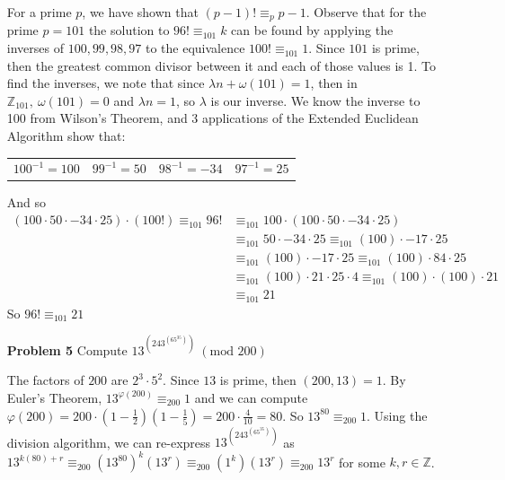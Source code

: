 \documentclass[letterpaper]{article}
\newcommand{\Integers}{\mathbb{Z}}
\begin{document}
\begin{itemize}
          For a prime \(p\), we have shown that \((p-1)! \equiv_{p} p-1\). Observe that for the prime \(p = 101\) the solution to \(96! \equiv_{101} k\) can be found by applying the inverses of \(100, 99, 98, 97\) to the equivalence \(100! \equiv_{101} 1\). Since \(101\) is prime, then the greatest common divisor between it and each of those values is 1. To find the inverses, we note that since \(\lambda n + \omega (101) = 1\), then in \(\Integers_{101},\ \omega (101) = 0 \) and \(\lambda n = 1\), so \(\lambda\) is our inverse. We know the inverse to 100 from Wilson's Theorem, and 3 applications of the Extended Euclidean Algorithm show that:
          \begin{center}
              \begin{tabular}{ p{2cm} p{2cm} p{2cm} p{2cm}}
                  \(100^{-1} = 100\) & \(99^{-1} = 50\) & \(98^{-1} = -34\) & \(97^{-1} = 25\)
              \end{tabular}
          \end{center}
          And so
          \begin{align*}
              (100\cdot 50 \cdot -34 \cdot 25) \cdot (100!)
              \equiv_{101} 96! & \equiv_{101} 100 \cdot (100\cdot 50 \cdot -34 \cdot 25)                   \\
                               & \equiv_{101} 50 \cdot -34 \cdot 25 \equiv_{101} (100) \cdot -17 \cdot 25  \\
                               & \equiv_{101} (100) \cdot -17 \cdot 25 \equiv_{101} (100) \cdot 84\cdot 25
              \\ &\equiv_{101} (100) \cdot 21 \cdot 25 \cdot 4 \equiv_{101} (100) \cdot (100)\cdot 21
              \\ & \equiv_{101} 21
          \end{align*}
          So \(96! \equiv_{101} 21\)
    \item[\textbf{Problem 5}] Compute \(13^{(243^{(65^{35})})}\ (\text{mod } 200)\)

          The factors of \(200\) are \(2^3\cdot 5^2\). Since \(13\) is prime, then \((200, 13) = 1\). By Euler's Theorem, \(13^{\varphi(200)} \equiv_{200} 1\) and we can compute \(\varphi(200) = 200\cdot( 1 - \frac{1}{2})(1 - \frac{1}{5}) = 200 \cdot \frac{4}{10} = 80\). So \(13^{80} \equiv_{200} 1\). Using the division algorithm, we can re-express \(13^{(243^{(65^{35})})}\) as \(13^{k(80) + r} \equiv_{200} (13^{80})^k (13^r) \equiv_{200} (1^k)(13^r) \equiv_{200} 13^r\) for some \(k, r \in \Integers\).


\end{itemize}
\end{document}
